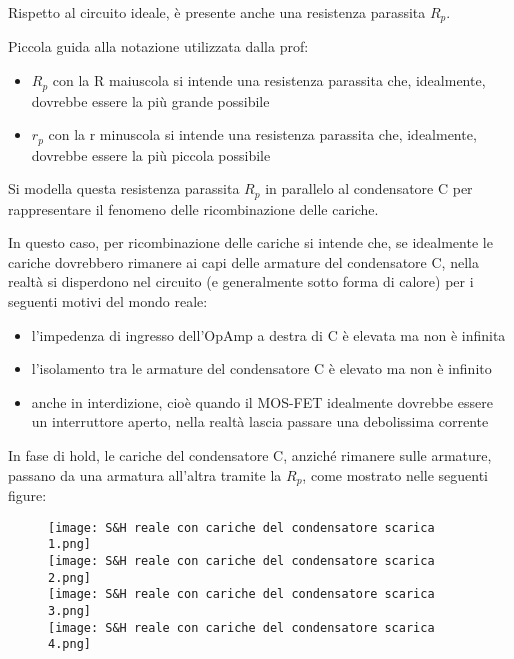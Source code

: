 Rispetto al circuito ideale, è presente anche una resistenza parassita $R_p$. \newline 

\begin{tcolorbox}
    Piccola guida alla notazione utilizzata dalla prof: 
    \begin{itemize}
        \item $R_p$ con la R maiuscola si intende una resistenza parassita che, idealmente, dovrebbe essere la più grande possibile 
        \item $r_p$ con la r minuscola si intende una resistenza parassita che, idealmente, dovrebbe essere la più piccola possibile
    \end{itemize}
\end{tcolorbox}

Si modella questa resistenza parassita $R_p$ in parallelo al condensatore C per rappresentare il fenomeno delle ricombinazione delle cariche. \newline 

In questo caso, per ricombinazione delle cariche si intende che, se idealmente le cariche dovrebbero rimanere ai capi delle armature del condensatore C, 
nella realtà si disperdono nel circuito (e generalmente sotto forma di calore) per i seguenti motivi del mondo reale: 

\begin{itemize}
    \item l'impedenza di ingresso dell'OpAmp a destra di C è elevata ma non è infinita 
    \item l'isolamento tra le armature del condensatore C è elevato ma non è infinito 
    \item anche in interdizione, cioè quando il MOS-FET idealmente dovrebbe essere un interruttore aperto, nella realtà lascia passare una debolissima corrente
\end{itemize}


In fase di hold, le cariche del condensatore C, anziché rimanere sulle armature, 
passano da una armatura all'altra tramite la $R_p$, come mostrato nelle seguenti figure: 

\begin{figure}[h]
    \centering
    \texttt{[image: S\&H reale con cariche del condensatore scarica 1.png]}
    \\
    \texttt{[image: S\&H reale con cariche del condensatore scarica 2.png]}
    \\
    \texttt{[image: S\&H reale con cariche del condensatore scarica 3.png]}
    \\
    \texttt{[image: S\&H reale con cariche del condensatore scarica 4.png]}
\end{figure}

